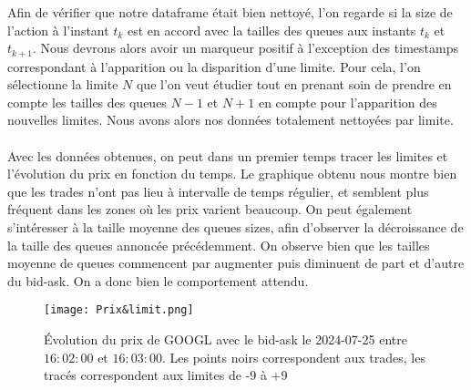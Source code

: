 \documentclass[12pt,a4paper]{article}
\theoremstyle{definition}
\theoremstyle{remark}
\begin{document}
Afin de vérifier que notre dataframe était bien nettoyé, l'on regarde si la size de l'action à l'instant $t_k$ est en accord avec la tailles des queues aux instants $t_k$ et $t_{k+1}$. Nous devrons alors avoir un marqueur positif à l’exception des timestamps correspondant à l'apparition ou la disparition d'une limite. Pour cela, l'on sélectionne la limite $N$ que l'on veut étudier tout en prenant soin de prendre en compte les tailles des queues $N-1$ et $N+1$ en compte pour l'apparition des nouvelles limites. Nous avons alors nos données totalement nettoyées par limite. 
\\
\\
Avec les données obtenues, on peut dans un premier temps tracer les limites et l'évolution du prix en fonction du temps. Le graphique obtenu nous montre bien que les trades n'ont pas lieu à intervalle de temps régulier, et semblent plus fréquent dans les zones où les prix varient beaucoup.
On peut également s'intéresser à la taille moyenne des queues sizes, afin d'observer la décroissance de la taille des queues annoncée précédemment. On observe bien que les tailles moyenne de queues commencent par augmenter puis diminuent de part et d'autre du bid-ask. On a donc bien le comportement attendu.
\begin{figure}[h!]
    \centering
    \texttt{[image: Prix\&limit.png]}
    \caption{Évolution du prix de GOOGL avec le bid-ask le 2024-07-25 entre $16:02:00$ et $16:03:00$. Les points noirs correspondent aux trades, les tracés correspondent aux limites de -9 à +9}
    \label{fig:graph}
\end{figure}
\end{document}
